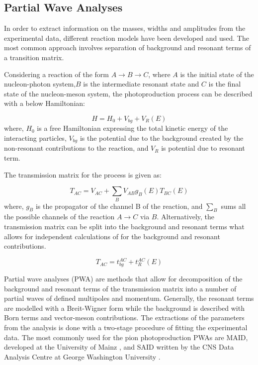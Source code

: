 \subsection{Partial Wave Analyses}

\indent In order to extract information on the masses, widths and amplitudes from the experimental data, different reaction models have been developed and used. The most common approach involves separation of background and resonant terms of a transition matrix.

\indent Considering a reaction of the form $A\rightarrow B\rightarrow C$, where $A$ is the initial state of the nucleon-photon system,$B$ is the intermediate resonant state and $C$ is the final state of the nucleon-meson system, the photoproduction process can be described with a below Hamiltonian:

\begin{equation}
H=H_{0}+V_{bg}+V_{R}(E)
\end{equation}
where, $H_{0}$ is a free Hamiltonian expressing the total kinetic energy of the interacting particles, $V_{bg}$ is the potential due to the background created by the non-resonant contributions to the reaction, and $V_{R}$ is potential due to resonant term.

\indent The transmission matrix for the process is given as:

\begin{equation}
T_{AC}=V_{AC}+\sum\limits_{B}V_{AB}g_{B}(E)T_{BC}(E)
\end{equation}
where, $g_{B}$ is the propagator of the channel B of the reaction, and $\sum\limits_{B}$ sums all the possible channels of the reaction $A\rightarrow C$ via $B$. Alternatively, the transmission matrix can be split into the background and resonant terms what allows for independent calculations of for the background and resonant contributions.

\begin{equation}
T_{AC}=t_{bg}^{AC}+t_{R}^{AC}(E)
\end{equation}

\indent Partial wave analyses (PWA) are methods that allow for decomposition of the background and resonant terms of the transmission matrix into a number of partial waves of defined multipoles and momentum. Generally, the resonant terms are modelled with a Breit-Wigner form while the background is described with Born terms and vector-meson contributions. The extractions of the parameters from the analysis is done with a two-stage procedure of fitting the experimental data. The most commonly used for the pion photoproduction PWAs are MAID, developed at the University of Mainz \cite{maid}, and SAID written by the CNS Data Analysis Centre at George Washington University \cite{said}.

